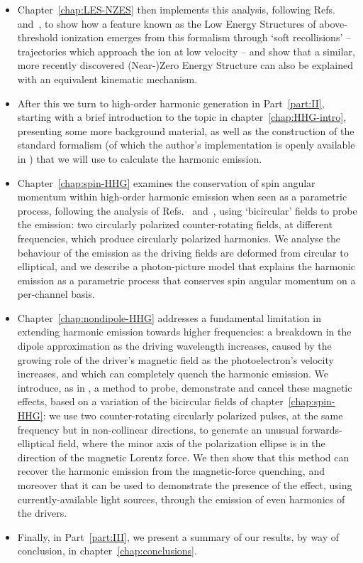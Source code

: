 \begin{itemize}
\item
Chapter~\ref{chap:LES-NZES} then implements this analysis, following Refs.~\citealp{Pisanty_slalom_2016} and~\citealp{Pisanty_kinematic_2016}, to show how a feature known as the Low Energy Structures of above-threshold ionization emerges from this formalism through `soft recollisions' -- trajectories which approach the ion at low velocity -- and show that a similar, more recently discovered \mbox{(Near-)Zero} Energy Structure can also be explained with an equivalent kinematic mechanism.

\item
After this we turn to high-order harmonic generation in Part~\ref{part:II}, starting with a brief introduction to the topic in chapter~\ref{chap:HHG-intro}, presenting some more background material, as well as the construction of the standard formalism (of which the author's implementation is openly available in ) that we will use to calculate the harmonic emission.

\item
Chapter~\ref{chap:spin-HHG} examines the conservation of spin angular momentum within high-order harmonic emission when seen as a parametric process, following the analysis of Refs.~\citealp{Ivanov_nature_photonics_2014} and~\citealp{ Pisanty_spin_conservation_2014}, using `bicircular' fields to probe the emission: two circularly polarized counter-rotating fields, at different frequencies, which produce circularly polarized harmonics. We analyse the behaviour of the emission as the driving fields are deformed from circular to elliptical, and we describe a photon-picture model that explains the harmonic emission as a parametric process that conserves spin angular momentum on a per-channel basis.

\item
Chapter~\ref{chap:nondipole-HHG} addresses a fundamental limitation in extending harmonic emission towards higher frequencies: a breakdown in the dipole approximation as the driving wavelength increases, caused by the growing role of the driver's magnetic field as the photoelectron's velocity increases, and which can completely quench the harmonic emission. We introduce, as in , a method to probe, demonstrate and cancel these magnetic effects, based on a variation of the bicircular fields of chapter~\ref{chap:spin-HHG}: we use two counter-rotating circularly polarized pulses, at the same frequency but in non-collinear directions, to generate an unusual forwards-elliptical field, where the minor axis of the polarization ellipse is in the direction of the magnetic Lorentz force. We then show that this method can recover the harmonic emission from the magnetic-force quenching, and moreover that it can be used to demonstrate the presence of the effect, using currently-available light sources, through the emission of even harmonics of the drivers.

\item Finally, in Part~\ref{part:III}, we present a summary of our results, by way of conclusion, in chapter~\ref{chap:conclusions}.

\end{itemize}
